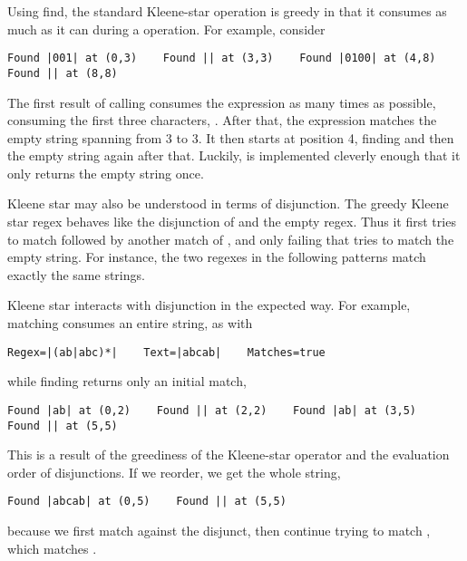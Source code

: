 Using find, the standard Kleene-star operation is greedy in that it
consumes as much as it can during a  operation.  For
example, consider
%
\begin{verbatim}
Found |001| at (0,3)    Found || at (3,3)    Found |0100| at (4,8)
Found || at (8,8)
\end{verbatim}
%
The first result of calling  consumes the expression
\code{[01]} as many times as possible, consuming the first three
characters, .  After that, the expression matches the empty
string spanning from 3 to 3.  It then starts at position 4, finding
 and then the empty string again after that.  Luckily,
 is implemented cleverly enough that it only returns the
empty string once.  

Kleene star may also be understood in terms of disjunction.  The
greedy Kleene star regex  behaves like the
disjunction of  and the empty regex.
Thus it first tries to match  followed by another match of
, and only failing that tries to match the empty
string.  For instance, the two regexes in the following patterns match
exactly the same strings.
%

Kleene star interacts with disjunction in the expected way.  For
example, matching consumes an entire string, as with
%
\begin{verbatim}
Regex=|(ab|abc)*|    Text=|abcab|    Matches=true
\end{verbatim}
%
while finding returns only an initial match, 
%
\begin{verbatim}
Found |ab| at (0,2)    Found || at (2,2)    Found |ab| at (3,5)
Found || at (5,5)
\end{verbatim}
%
This is a result of the greediness of the Kleene-star operator
and the evaluation order of disjunctions.  If we reorder, we 
get the whole string,
%
\begin{verbatim}
Found |abcab| at (0,5)    Found || at (5,5)
\end{verbatim}
%
because we first match  against the disjunct, then continue
trying to match , which matches .

